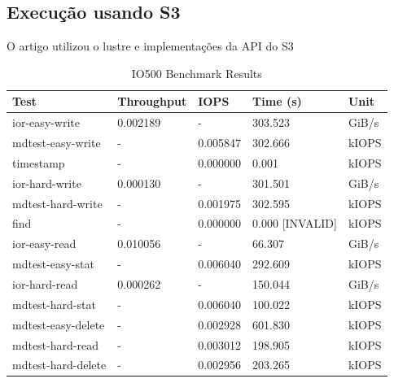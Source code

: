 \documentclass[article,a4paper,12pt,brazil,sumario=tradicional]{abntex2}
\begin{document}
\subsection{Execução usando S3}
O artigo utilizou o lustre e implementações da API do S3 
\begin{table}[htb]
	\centering
	\begin{tabular}{|l|l|l|l|l|}
		\hline
		\rowcolor[HTML]{EFEFEF}
		\textbf{Test}          & \textbf{Throughput}        & \textbf{IOPS}         & \textbf{Time (s)} & \textbf{Unit} \\ \hline
		ior-easy-write         & 0.002189                    & -                    & 303.523           & GiB/s         \\ \hline
		mdtest-easy-write      & -                          & 0.005847             & 302.666           & kIOPS         \\ \hline
		timestamp              & -                          & 0.000000             & 0.001             & kIOPS         \\ \hline
		ior-hard-write         & 0.000130                    & -                    & 301.501           & GiB/s         \\ \hline
		mdtest-hard-write      & -                          & 0.001975             & 302.595           & kIOPS         \\ \hline
		find                   & -                          & 0.000000             & 0.000 [INVALID]   & kIOPS         \\ \hline
		ior-easy-read          & 0.010056                    & -                    & 66.307            & GiB/s         \\ \hline
		mdtest-easy-stat       & -                          & 0.006040             & 292.609           & kIOPS         \\ \hline
		ior-hard-read          & 0.000262                    & -                    & 150.044           & GiB/s         \\ \hline
		mdtest-hard-stat       & -                          & 0.006040             & 100.022           & kIOPS         \\ \hline
		mdtest-easy-delete     & -                          & 0.002928             & 601.830           & kIOPS         \\ \hline
		mdtest-hard-read       & -                          & 0.003012             & 198.905           & kIOPS         \\ \hline
		mdtest-hard-delete     & -                          & 0.002956             & 203.265           & kIOPS         \\ \hline
	\end{tabular}
	\caption{IO500 Benchmark Results}
	\label{tab:io500-results}
\end{table}
\end{document}
